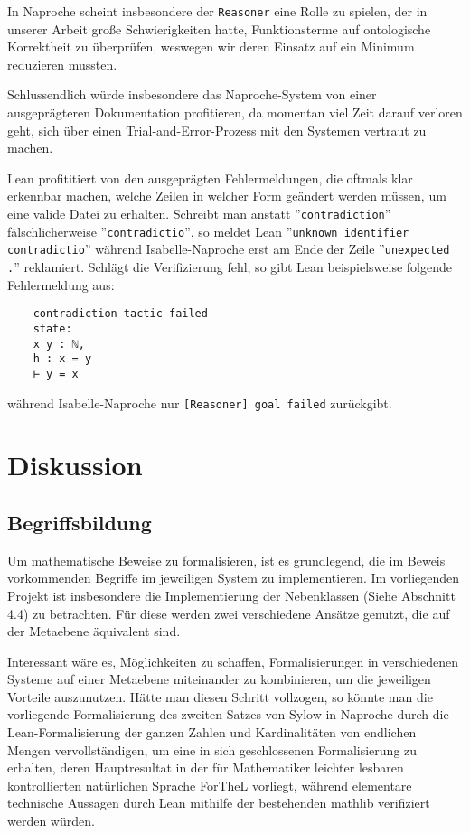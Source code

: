 \documentclass[a4paper,12pt]{scrartcl}
\begin{document}
In Naproche scheint insbesondere der \verb!Reasoner!  eine Rolle zu spielen, der in unserer Arbeit große Schwierigkeiten hatte, Funktionsterme auf ontologische Korrektheit zu überprüfen, weswegen wir deren Einsatz auf ein Minimum reduzieren mussten.

Schlussendlich würde insbesondere das Naproche-System von einer ausgeprägteren Dokumentation profitieren, da momentan viel Zeit darauf verloren geht, sich über einen Trial-and-Error-Prozess mit den Systemen vertraut zu machen.

Lean profititiert von den ausgeprägten Fehlermeldungen, die oftmals klar erkennbar machen, welche Zeilen in welcher Form geändert werden müssen, um eine valide Datei zu erhalten.
Schreibt man anstatt ''\verb!contradiction!'' fälschlicherweise ''\verb!contradictio!'', so meldet Lean ''\verb!unknown identifier contradictio!'' während Isabelle-Naproche erst am Ende der Zeile ''\verb!unexpected .!'' reklamiert. Schlägt die Verifizierung fehl, so gibt Lean beispielsweise folgende Fehlermeldung aus:
\begin{lstlisting}
    contradiction tactic failed
    state:
    x y : ℕ,
    h : x = y
    ⊢ y = x
\end{lstlisting}
während Isabelle-Naproche nur \verb![Reasoner] goal failed! zurückgibt.



\newpage

\section{Diskussion}

\subsection{Begriffsbildung}

Um mathematische Beweise zu formalisieren, ist es grundlegend, die im Beweis vorkommenden Begriffe im jeweiligen System zu implementieren. Im vorliegenden Projekt ist insbesondere die Implementierung der Nebenklassen (Siehe Abschnitt 4.4) zu betrachten. Für diese werden zwei verschiedene Ansätze genutzt, die auf der Metaebene äquivalent sind.

Interessant wäre es, Möglichkeiten zu schaffen, Formalisierungen in verschiedenen Systeme auf einer Metaebene miteinander zu kombinieren, um die jeweiligen Vorteile auszunutzen. Hätte man diesen Schritt vollzogen, so könnte man die vorliegende Formalisierung des zweiten Satzes von Sylow in Naproche durch die Lean-Formalisierung der ganzen Zahlen und Kardinalitäten von endlichen Mengen vervollständigen, um eine in sich geschlossenen Formalisierung zu erhalten, deren Hauptresultat in der für Mathematiker leichter lesbaren kontrollierten natürlichen Sprache ForTheL vorliegt, während elementare technische Aussagen durch Lean mithilfe der bestehenden mathlib verifiziert werden würden.
\end{document}

